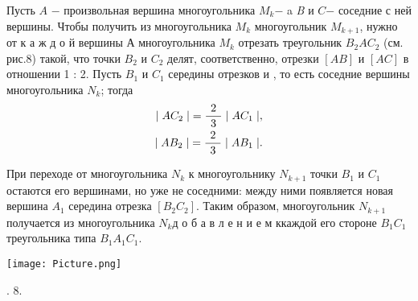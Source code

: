 \begin{minipage}[t]{0,5\linewidth}
Пусть $A$ \hspace{0.5mm}$-$ \hspace{1mm}произвольная вершина многоугольника $M_k$\hspace{1mm}$-$ a \textit{B} и $C$\hspace{1mm}$-$ соседние с ней вершины. Чтобы получить из многоугольника $M_k$ многоугольник $M_{k + 1}$, нужно от \hspace{2mm}к а ж д о й \hspace{2mm}вершины А многоугольника $M_k$ отрезать треугольник $B_2AC_2$ (см. рис.8) такой, что точки $B_2$ и $C_2$ делят, соответственно, отрезки $[AB]$ и $[AC]$ в отношении 1 : 2. Пусть $B_1$ и $C_1$ середины отрезков и , то есть соседние вершины многоугольника $N_k$; тогда
\begin{align}
    |\hspace{1mm}AC_2\hspace{1mm}| = \frac{\hspace{1.5mm}2\hspace{1.5mm}}{3}\hspace{1mm}|\hspace{1mm}AC_1\hspace{1mm}|, \\
    |\hspace{1mm}AB_2\hspace{1mm}| = \frac{\hspace{1.5mm}2\hspace{1.5mm}}{3}\hspace{1mm}|\hspace{1mm}AB_1\hspace{1mm}|. \nonumber
\end{align}

При переходе от многоугольника $N_k$ к многоугольнику $N_{k + 1}$ точки $B_1$ и $C_1$ остаются его вершинами, но уже не соседними: между ними появляется новая вершина $A_1$ середина отрезка $[B_2C_2]$. Таким образом, многоугольник $N_{k + 1}$ получается из многоугольника $N_k$\hspace{3mm}д о б а в л е н и е м к\hspace{3mm}каждой его стороне $B_1C_1$ треугольника типа $B_1A_1C_1$.
\bigskip

\noindent\texttt{[image: Picture.png]}

. 8.
\end{minipage}\quad
